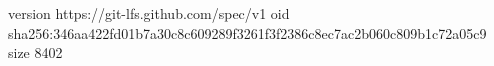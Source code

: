 version https://git-lfs.github.com/spec/v1
oid sha256:346aa422fd01b7a30c8c609289f3261f3f2386c8ec7ac2b060c809b1c72a05c9
size 8402

